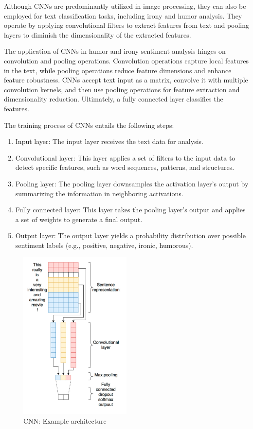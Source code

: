 \documentclass[a4paper]{article}
\begin{document}
Although CNNs are predominantly utilized in image processing, they can also be employed for text classification tasks, including irony and humor analysis. They operate by applying convolutional filters to extract features from text and pooling layers to diminish the dimensionality of the extracted features.

The application of CNNs in humor and irony sentiment analysis hinges on convolution and pooling operations. Convolution operations capture local features in the text, while pooling operations reduce feature dimensions and enhance feature robustness. CNNs accept text input as a matrix, convolve it with multiple convolution kernels, and then use pooling operations for feature extraction and dimensionality reduction. Ultimately, a fully connected layer classifies the features.

The training process of CNNs entails the following steps:

\begin{enumerate}
\item Input layer: The input layer receives the text data for analysis.
\item Convolutional layer: This layer applies a set of filters to the input data to detect specific features, such as word sequences, patterns, and structures.
\item Pooling layer: The pooling layer downsamples the activation layer's output by summarizing the information in neighboring activations.
\item Fully connected layer: This layer takes the pooling layer's output and applies a set of weights to generate a final output.
\item Output layer: The output layer yields a probability distribution over possible sentiment labels (e.g., positive, negative, ironic, humorous).
\end{enumerate}

\begin{figure}[H]
	\centering
	\includegraphics[width=0.5\textwidth]{./images/CNN_architecture.png}
	\caption{CNN: Example architecture}
	\label{fig.CNN[CNN for situations understanding based on sentiment analysis of twitter data]}
\end{figure}
\end{document}
